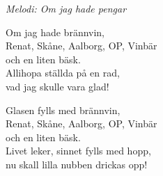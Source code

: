 {\footnotesize\textit{Melodi: Om jag hade pengar}}\par
\vspace{10pt}
Om jag hade brännvin,\\
Renat, Skåne, Aalborg, OP, Vinbär \\
och en liten bäsk.\\
Allihopa ställda på en rad,\\
vad jag skulle vara glad! \par
\vspace{10pt}
Glasen fylls med brännvin,\\
Renat, Skåne, Aalborg, OP, Vinbär\\
och en liten bäsk.\\
Livet leker, sinnet fylls med hopp,\\
nu skall lilla nubben drickas opp!

